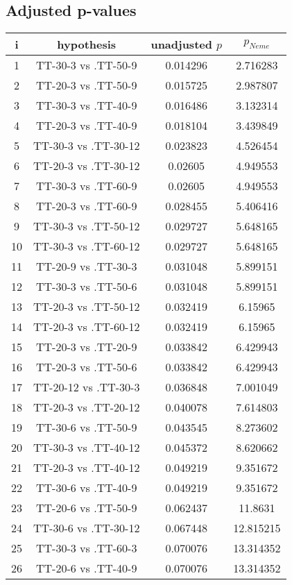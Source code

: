 \documentclass[a4paper,10pt]{article}
\begin{document}
\begin{landscape}
\pagebreak

\subsection{Adjusted p-values}

\begin{table}[!htp]
\centering\scriptsize
\begin{tabular}{cccc}
i&hypothesis&unadjusted $p$&$p_{Neme}$\\
\hline1&TT-30-3 vs .TT-50-9&0.014296&2.716283\\
2&TT-20-3 vs .TT-50-9&0.015725&2.987807\\
3&TT-30-3 vs .TT-40-9&0.016486&3.132314\\
4&TT-20-3 vs .TT-40-9&0.018104&3.439849\\
5&TT-30-3 vs .TT-30-12&0.023823&4.526454\\
6&TT-20-3 vs .TT-30-12&0.02605&4.949553\\
7&TT-30-3 vs .TT-60-9&0.02605&4.949553\\
8&TT-20-3 vs .TT-60-9&0.028455&5.406416\\
9&TT-30-3 vs .TT-50-12&0.029727&5.648165\\
10&TT-30-3 vs .TT-60-12&0.029727&5.648165\\
11&TT-20-9 vs .TT-30-3&0.031048&5.899151\\
12&TT-30-3 vs .TT-50-6&0.031048&5.899151\\
13&TT-20-3 vs .TT-50-12&0.032419&6.15965\\
14&TT-20-3 vs .TT-60-12&0.032419&6.15965\\
15&TT-20-3 vs .TT-20-9&0.033842&6.429943\\
16&TT-20-3 vs .TT-50-6&0.033842&6.429943\\
17&TT-20-12 vs .TT-30-3&0.036848&7.001049\\
18&TT-20-3 vs .TT-20-12&0.040078&7.614803\\
19&TT-30-6 vs .TT-50-9&0.043545&8.273602\\
20&TT-30-3 vs .TT-40-12&0.045372&8.620662\\
21&TT-20-3 vs .TT-40-12&0.049219&9.351672\\
22&TT-30-6 vs .TT-40-9&0.049219&9.351672\\
23&TT-20-6 vs .TT-50-9&0.062437&11.8631\\
24&TT-30-6 vs .TT-30-12&0.067448&12.815215\\
25&TT-30-3 vs .TT-60-3&0.070076&13.314352\\
26&TT-20-6 vs .TT-40-9&0.070076&13.314352\\

\end{tabular}
\end{table}
\end{landscape}
\end{document}
